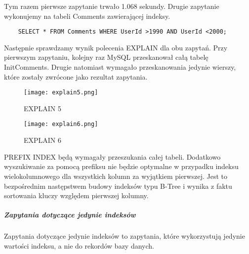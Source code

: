 Tym razem pierwsze zapytanie trwało 1.068 sekundy. Drugie zapytanie wykonujemy na tabeli Comments zawierającej indeksy.
\begin{verbatim}
    SELECT * FROM Comments WHERE UserId >1990 AND UserId <2000;
\end{verbatim}
Następnie sprawdzamy wynik polecenia EXPLAIN dla obu zapytań. Przy pierwszym zapytaniu, kolejny raz MySQL przeskanował całą tabelę Init\textunderscore Comments. Drugie natomiast wymagało przeskanowania jedynie wierszy, które zostały zwrócone jako rezultat zapytania.

\begin{figure}[h]
    \texttt{[image: explain5.png]} 
    \caption{EXPLAIN 5}
\end{figure}

\begin{figure}[h]
    \texttt{[image: explain6.png]} 
    \caption{EXPLAIN 6}
\end{figure}


PREFIX INDEX
będą wymagały przeszukania całej tabeli. Dodatkowo wyszukiwanie za pomocą prefiksu nie będzie optymalne w przypadku indeksu wielokolumnowego dla wszystkich kolumn za wyjątkiem pierwszej. Jest to bezpośrednim następstwem budowy indeksów typu B-Tree i wynika z faktu sortowania kluczy względem pierwszej kolumny.





\subparagraph{Zapytania dotyczące jedynie indeksów}\mbox{}
Zapytania dotyczące jedynie indeksów to zapytania, które wykorzystują jedynie wartości indeksu, a nie do rekordów bazy danych.





